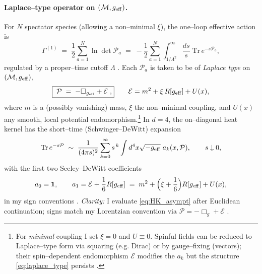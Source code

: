 \documentclass{iopjournal}
\begin{document}
\paragraph{Laplace–type operator on $(\mathcal{M},g_{\rm eff})$.}
For $N$ spectator species (allowing a non–minimal $\xi$), the one–loop effective action is
\begin{equation}
\Gamma^{(1)}\;=\;\frac{1}{2}\sum_{a=1}^{N}\ln\det \mathcal{P}_a
\;=\;-\frac{1}{2}\sum_{a=1}^{N}\int_{1/\Lambda^2}^\infty\frac{ds}{s}\;\mathrm{Tr}\,e^{-s\mathcal{P}_a},
\label{eq:proper_time}
\end{equation}
regulated by a proper–time cutoff $\Lambda$ \cite{DeWitt1965,BarvinskyVilkovisky,ParkerToms,Vassilevich2003}. Each $\mathcal{P}_a$ is taken to be of \emph{Laplace type} on $(\mathcal{M},g_{\rm eff})$,
\begin{equation}
\boxed{\;\mathcal{P}\;=\;-\Box_{g_{\rm eff}}+\mathcal{E}\;,}\qquad
\mathcal{E}=m^2+\xi\,R[g_{\rm eff}]+U(x),
\label{eq:laplace_type}
\end{equation}
where $m$ is a (possibly vanishing) mass, $\xi$ the non–minimal coupling, and $U(x)$ any smooth, local potential endomorphism.\footnote{For \emph{minimal} coupling I set $\xi=0$ and $U\equiv 0$. Spinful fields can be reduced to Laplace–type form via squaring (e.g. Dirac) or by gauge–fixing (vectors); their spin–dependent endomorphism $\mathcal{E}$ modifies the $a_k$ but the structure \eqref{eq:laplace_type} persists \cite{ParkerToms,Vassilevich2003,Avramidi2000}.}
In $d=4$, the on–diagonal heat kernel has the short–time (Schwinger–DeWitt) expansion
\begin{equation}
\mathrm{Tr}\,e^{-s\mathcal{P}}\;\sim\;\frac{1}{(4\pi s)^2}\sum_{k=0}^\infty s^{\,k}\int d^4x\sqrt{-g_{\rm eff}}\;a_k(x,\mathcal{P}),
\qquad s\downarrow 0,
\label{eq:HK_asympt}
\end{equation}
with the first two Seeley–DeWitt coefficients
\begin{equation}
a_0=\mathbf{1},
\qquad
a_1=\mathcal{E}+\frac{1}{6}R[g_{\rm eff}]
\;=\;m^2+\Big(\xi+\frac{1}{6}\Big)R[g_{\rm eff}]+U(x),
\label{eq:a0a1}
\end{equation}
in my sign conventions \cite{DeWitt1965,Vassilevich2003,Avramidi2000}. \emph{Clarity:} I evaluate \eqref{eq:HK_asympt} after Euclidean continuation; signs match my Lorentzian convention via $\mathcal{P}=-\Box_g+\mathcal{E}$ \cite{ParkerToms,Vassilevich2003}.
\end{document}

